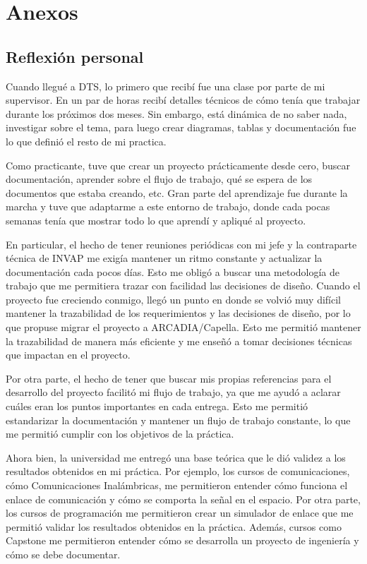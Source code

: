 \leftskip 0in
\parindent 0.49cm %
\newpage
\section{Anexos}

\subsection{Reflexión personal}

Cuando llegué a DTS, lo primero que recibí fue una clase por parte de mi supervisor. En un par de horas recibí detalles técnicos de cómo tenía que trabajar durante los próximos dos meses. Sin embargo, está dinámica de no saber nada, investigar sobre el tema, para luego crear diagramas, tablas y documentación fue lo que definió el resto de mi practica.

Como practicante, tuve que crear un proyecto prácticamente desde cero, buscar documentación, aprender sobre el flujo de trabajo, qué se espera de los documentos que estaba creando, etc. Gran parte del aprendizaje fue durante la marcha y tuve que adaptarme a este entorno de trabajo, donde cada pocas semanas tenía que mostrar todo lo que aprendí y apliqué al proyecto.

En particular, el hecho de tener reuniones periódicas con mi jefe y la contraparte técnica de INVAP me exigía mantener un ritmo constante y actualizar la documentación cada pocos días. Esto me obligó a buscar una metodología de trabajo que me permitiera trazar con facilidad las decisiones de diseño. Cuando el proyecto fue creciendo conmigo, llegó un punto en donde se volvió muy difícil mantener la trazabilidad de los requerimientos y las decisiones de diseño, por lo que propuse migrar el proyecto a ARCADIA/Capella. Esto me permitió mantener la trazabilidad de manera más eficiente y me enseñó a tomar decisiones técnicas que impactan en el proyecto.

Por otra parte, el hecho de tener que buscar mis propias referencias para el desarrollo del proyecto facilitó mi flujo de trabajo, ya que me ayudó a aclarar cuáles eran los puntos importantes en cada entrega. Esto me permitió estandarizar la documentación y mantener un flujo de trabajo constante, lo que me permitió cumplir con los objetivos de la práctica.

Ahora bien, la universidad me entregó una base teórica que le dió validez a los resultados obtenidos en mi práctica. Por ejemplo, los cursos de comunicaciones, cómo Comunicaciones Inalámbricas, me permitieron entender cómo funciona el enlace de comunicación y cómo se comporta la señal en el espacio. Por otra parte, los cursos de programación me permitieron crear un simulador de enlace que me permitió validar los resultados obtenidos en la práctica. Además, cursos como Capstone me permitieron entender cómo se desarrolla un proyecto de ingeniería y cómo se debe documentar.

